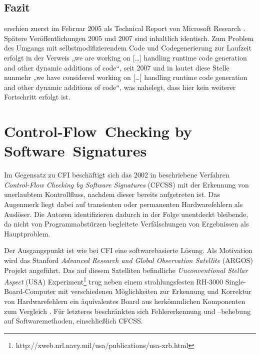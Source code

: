 \documentclass[11pt]{article}
\begin{document}
\subsection{Fazit}

\cite{abadi-2009-control-tissec} erschien zuerst im Februar 2005 als Technical
Report von Microsoft Research \cite{abadi-2005-control-msr}. Spätere
Veröffentlichungen 2005 und 2007 sind inhaltlich identisch. Zum Problem des
Umgangs mit selbstmodifizierendem Code und Codegenerierung zur Laufzeit erfolgt
in \cite{abadi-2005-control-msr} der Verweis „we are working on […] handling
runtime code generation and other dynamic additions of code“, seit 2007 und in
\cite{abadi-2009-control-tissec} lautet diese Stelle nunmehr „we have
considered working on […] handling runtime code generation and other dynamic
additions of code“, was nahelegt, dass hier kein weiterer Fortschritt erfolgt
ist. %

\section{Control-Flow~Checking by Software~Signatures}


Im Gegensatz zu CFI beschäftigt sich das 2002 in \cite{oh-2002-control}
beschriebene Verfahren \emph{Control-Flow Checking by Software Signatures}
(CFCSS) mit der Erkennung von unerlaubtem Kontrollfluss, nachdem dieser bereits
aufgetreten ist. Das Augenmerk liegt dabei auf transienten oder permanenten
Hardwarefehlern als Auslöser. Die Autoren identifizieren dadurch in der Folge
unentdeckt bleibende, da nicht von Programmabstürzen begleitete Verfälschungen
von Ergebnissen als Hauptproblem.

Der Ausgangspunkt ist wie bei CFI eine softwarebasierte Lösung. Als Motivation
wird das Stanford \emph{Advanced Research and Global Observation Satellite}
(ARGOS) Projekt angeführt. Das auf diesem Satelliten befindliche
\emph{Unconventional Stellar Aspect} (USA)
Experiment\footnote{http://xweb.nrl.navy.mil/usa/publications/usa-xrb.html}
trug neben einem strahlungsfesten RH-3000 Single-Board-Computer mit
verschiedenen Möglichkeiten zur Erkennung und Korrektur von Hardwarefehlern ein
äquivalentes Board aus herkömmlichen Komponenten zum
Vergleich \cite{argos-2002-lessons}. Für letzteres beschränkten sich
Fehlererkennung und –behebung auf Softwaremethoden, einschließlich CFCSS.
\end{document}
